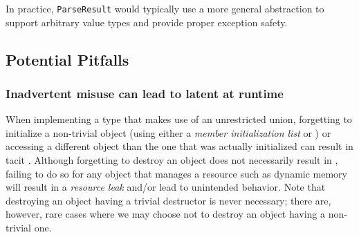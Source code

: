 In practice, \lstinline!ParseResult! would typically use a more general  abstraction to support arbitrary value types and provide proper exception safety.


\subsection[Potential Pitfalls]{Potential Pitfalls}\label{potential-pitfalls}

\subsubsection[Inadvertent misuse can lead to latent \romeogloss{undefined behavior} at runtime]{Inadvertent misuse can lead to latent  at runtime}\label{inadvertent-misuse-can-lead-to-latent-undefined-behavior-at-runtime}

When implementing a type that makes use of an unrestricted union,
forgetting to initialize a non-trivial object (using either a
\emph{member initialization list} or ) or
accessing a different object than the one that was actually initialized
can result in tacit . Although forgetting to
destroy an object does not necessarily result in , failing to do so for any object that manages a resource such
as dynamic memory will result in a \emph{resource leak} and/or lead to
unintended behavior. Note that destroying an
object having a trivial destructor is never necessary; there are, however, rare cases where
we may choose not to destroy an object having a non-trivial
one.

